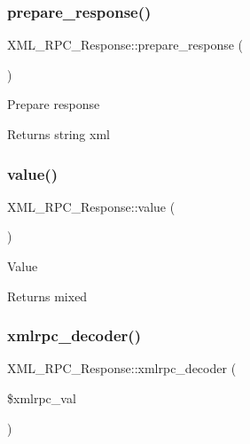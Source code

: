 \subsubsection{\texorpdfstring{prepare\+\_\+response()}{prepare\_response()}}
{\footnotesize\ttfamily X\+M\+L\+\_\+\+R\+P\+C\+\_\+\+Response\+::prepare\+\_\+response (\begin{DoxyParamCaption}{ }\end{DoxyParamCaption})}

Prepare response

\begin{DoxyReturn}{Returns}
string xml 
\end{DoxyReturn}
\mbox{\label{class_x_m_l___r_p_c___response_ab4c3695cda7215f664ff2759f3f5ec83}} 
\subsubsection{\texorpdfstring{value()}{value()}}
{\footnotesize\ttfamily X\+M\+L\+\_\+\+R\+P\+C\+\_\+\+Response\+::value (\begin{DoxyParamCaption}{ }\end{DoxyParamCaption})}

Value

\begin{DoxyReturn}{Returns}
mixed 
\end{DoxyReturn}
\mbox{\label{class_x_m_l___r_p_c___response_a402e8c1a164202b6f67b400a3aa69c05}} 
\subsubsection{\texorpdfstring{xmlrpc\+\_\+decoder()}{xmlrpc\_decoder()}}
{\footnotesize\ttfamily X\+M\+L\+\_\+\+R\+P\+C\+\_\+\+Response\+::xmlrpc\+\_\+decoder (\begin{DoxyParamCaption}\item[{}]{\$xmlrpc\+\_\+val }\end{DoxyParamCaption})}

